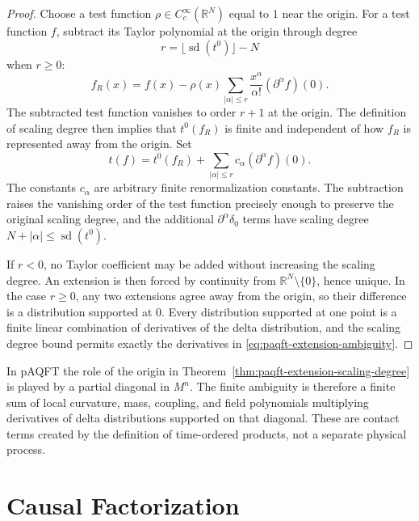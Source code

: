 \begin{proof}
Choose a test function \(\rho\in C_c^\infty(\mathbb R^N)\) equal to \(1\)
near the origin.  For a test function \(f\), subtract its Taylor polynomial
at the origin through degree
\[
  r=\lfloor\operatorname{sd}(t^0)\rfloor-N
\]
when \(r\ge0\):
\begin{equation}
  f_R(x)=
  f(x)-
  \rho(x)\sum_{|\alpha|\le r}\frac{x^\alpha}{\alpha!}
  (\partial^\alpha f)(0).
  \label{eq:paqft-taylor-subtracted-test-function}
\end{equation}
The subtracted test function vanishes to order \(r+1\) at the origin.  The
definition of scaling degree then implies that \(t^0(f_R)\) is finite and
independent of how \(f_R\) is represented away from the origin.  Set
\begin{equation}
  t(f)=t^0(f_R)+\sum_{|\alpha|\le r}c_\alpha(\partial^\alpha f)(0).
  \label{eq:paqft-extension-by-taylor-subtraction}
\end{equation}
The constants \(c_\alpha\) are arbitrary finite renormalization constants.
The subtraction raises the vanishing order of the test function precisely
enough to preserve the original scaling degree, and the additional
\(\partial^\alpha\delta_0\) terms have scaling degree \(N+|\alpha|\le
\operatorname{sd}(t^0)\).

If \(r<0\), no Taylor coefficient may be added without increasing the scaling
degree.  An extension is then forced by continuity from
\(\mathbb R^N\setminus\{0\}\), hence unique.  In the case \(r\ge0\), any two
extensions agree away from the origin, so their difference is a distribution
supported at \(0\).  Every distribution supported at one point is a finite
linear combination of derivatives of the delta distribution, and the scaling
degree bound permits exactly the derivatives in
\eqref{eq:paqft-extension-ambiguity}.
\end{proof}

In pAQFT the role of the origin in
Theorem~\ref{thm:paqft-extension-scaling-degree} is played by a partial
diagonal in \(M^n\).  The finite ambiguity is therefore a finite sum of local
curvature, mass, coupling, and field polynomials multiplying derivatives of
delta distributions supported on that diagonal.  These are contact terms
created by the definition of time-ordered products, not a separate physical
process.

\section{Causal Factorization}


